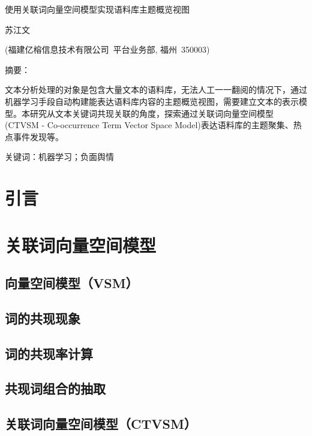 \documentclass[cs5size,oneside,twocolumn]{ctexart}
\def\VARtitle{}
\renewcommand{\title}[1]{
    \def\VARtitle{#1}
}
\def\VARauthor{}
\renewcommand{\author}[1]{
    \def\VARauthor{#1}
}
\def\VARaddress{}
\newcommand{\address}[1]{
    \def\VARaddress{#1}
}
\def\VARkeywords{}
\newcommand{\keywords}[1]{
    \def\VARkeywords{#1}
}
\def\VARcnabstract{}
\newcommand{\cnabstract}[1]{
    \def\VARcnabstract{#1}
}
\renewcommand{\maketitle}{%
    \pagestyle{frontmatter}
    \begin{strip}
    \articletitle
    \end{strip}
}
\newenvironment{cabstract}{%
    \vspace*{2bp}
    {\zihao{-5}\heiti 摘要：}
    }{%

        {\zihao{-5}\heiti 关键词：}{\zihao{-5}\songti \VARkeywords}
}
\newcommand{\articletitle}{
    \begin{spacing}{1.2}
    \begin{center}
        \begin{minipage}[c]{16cm}
        \vskip 10bp
        \centerline{\zihao{3}\ziju{0.0}\heiti \VARtitle }
        \vskip 20bp
        \centerline{\zihao{5}\ziju{0.0}\songti \VARauthor }
        \vskip 5bp
        \centerline{\zihao{-5}\ziju{0.0}\songti \VARaddress }
        \vskip 10bp
        
        \begin{cabstract}
            {\zihao{-5}\songti \VARcnabstract}
        \end{cabstract}


        \end{minipage}
    \end{center}
    \end{spacing}

    \vskip 25bp
}
\begin{document}
\title{使用关联词向量空间模型实现语料库主题概览视图}
\author{苏江文}
\address{(福建亿榕信息技术有限公司~平台业务部, 福州~350003)}
\keywords{机器学习；负面舆情}
\cnabstract{文本分析处理的对象是包含大量文本的语料库，无法人工一一翻阅的情况下，通过机器学习手段自动构建能表达语料库内容的主题概览视图，需要建立文本的表示模型。本研究从文本关键词共现关联的角度，探索通过关联词向量空间模型(CTVSM - Co-occurrence Term Vector Space Model)表达语料库的主题聚集、热点事件发现等。}

\maketitle

\pagestyle{mainmatter}


\section{引言}


\section{关联词向量空间模型}

    \subsection{向量空间模型（VSM）}
    

    \subsection{词的共现现象}
    

    \subsection{词的共现率计算}
    

    \subsection{共现词组合的抽取}
    

    \subsection{关联词向量空间模型（CTVSM）}
    
\end{document}
